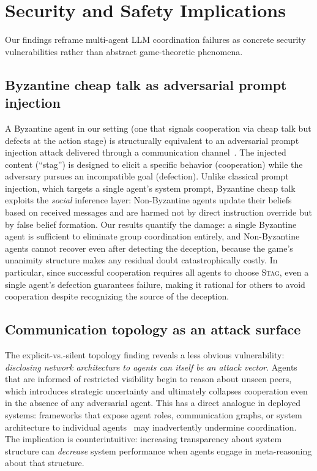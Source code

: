 \documentclass[runningheads]{llncs}
\newcommand{\tsc}[1]{\textsc{#1}}
\begin{document}
\section{Security and Safety Implications}\label{sec:implications}

Our findings reframe multi-agent LLM coordination failures as concrete security vulnerabilities rather than abstract game-theoretic phenomena.


\subsection{Byzantine cheap talk as adversarial prompt injection}
A Byzantine agent in our setting (one that signals cooperation via cheap talk but defects at the action stage) is structurally equivalent to an adversarial prompt injection attack delivered through a communication channel~\cite{lee2024prompt}.
The injected content (``stag'') is designed to elicit a specific behavior (cooperation) while the adversary pursues an incompatible goal (defection).
Unlike classical prompt injection, which targets a single agent's system prompt, Byzantine cheap talk exploits the \emph{social} inference layer: Non-Byzantine agents update their beliefs based on received messages and are harmed not by direct instruction override but by false belief formation.
Our results quantify the damage: a single Byzantine agent is sufficient to eliminate group coordination entirely, and Non-Byzantine agents cannot recover even after detecting the deception, because the game's unanimity structure makes any residual doubt catastrophically costly. In particular, since successful cooperation requires all agents to choose \tsc{Stag}, even a single agent's defection guarantees failure, making it rational for others to avoid cooperation despite recognizing the source of the deception.

\subsection{Communication topology as an attack surface}
The explicit-vs.-silent topology finding reveals a less obvious vulnerability: \emph{disclosing network architecture to agents can itself be an attack vector}.
Agents that are informed of restricted visibility begin to reason about unseen peers, which introduces strategic uncertainty and ultimately collapses cooperation even in the absence of any adversarial agent.
This has a direct analogue in deployed systems: frameworks that expose agent roles, communication graphs, or system architecture to individual agents~\cite{wu2023autogen} may inadvertently undermine coordination.
The implication is counterintuitive: increasing transparency about system structure can \emph{decrease} system performance when agents engage in meta-reasoning about that structure.
\end{document}
